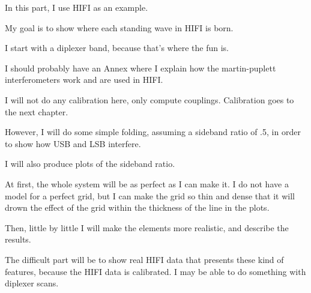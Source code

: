 In this part, I use HIFI as an example.

My goal is to show where each standing wave in HIFI is born.

I start with a diplexer band, because that's where the fun is.

I should probably have an Annex where I explain how the martin-puplett interferometers work and are used in HIFI.

I will not do any calibration here, only compute couplings.  Calibration goes to the next chapter.

However, I will do some simple folding, assuming a sideband ratio of .5, in order to show how USB and LSB interfere.

I will also produce plots of the sideband ratio.

At first, the whole system will be as perfect as I can make it.  I do not have a model for a perfect grid, but I can make the grid so thin and dense that it will drown the effect of the grid within the thickness of the line in the plots.

Then, little by little I will make the elements more realistic, and describe the results.

The difficult part will be to show real HIFI data that presents these kind of features, because the HIFI data is calibrated.  I may be able to do something with diplexer scans.
